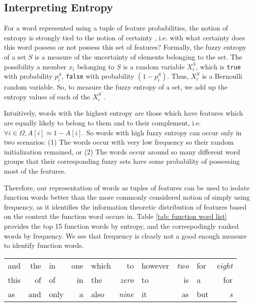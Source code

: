 \documentclass[11pt,a4paper]{article}
\begin{document}
\subsection{Interpreting Entropy} 
\label{ssec: entropy math}
For a word represented using a tuple of feature probabilities, the notion of entropy is strongly tied to the notion of certainty \citep{xuecheng1992entropy}, i.e. with what certainty does this word possess or not possess this set of features? Formally, the fuzzy entropy of a set $S$ is a measure of the uncertainty of elements belonging to the set. The possibility a member $x_i$ belonging to $S$ is a random variable $X^S_i$, which is \texttt{true} with probability $p^S_i$, \texttt{false} with probability $(1 - p^S_i)$. Thus, $X^S_i$ is a Bernoulli random variable. So, to measure the fuzzy entropy of a set, we add up the entropy values of each of the $X^S_i$ \citep{mackay2003information}. 

Intuitively, words with the highest entropy are those which have features which are equally likely to belong to them and to their complement, i.e. $\forall i \in \Omega, A[i] \simeq 1 - A[i]$. So words with high fuzzy entropy can occur only in two scenarios: (1) The words occur with very low frequency so their random initialization remained, or (2) The words occur around so many different word groups that their corresponding fuzzy sets have some probability of possessing most of the features.

Therefore, our representation of words as tuples of features can be used to isolate function words better than the more commonly considered notion of simply using frequency, as it identifies the information theoretic distribution of features based on the context the function word occurs in. Table \ref{tab: function word list} provides the top 15 function words by entropy, and the correspodingly ranked words by frequency. We see that frequency is clearly not a good enough measure to identify function words. 

{\tiny
\begin{table*}[t]
    \centering
    {\small
    \begin{tabular}{l r | l r | l r | l r | l r}
    and		& the   &   in		&   one         &   which	    &   to          &   however	&   \emph{two}  &   for	    &   \emph{eight}  \\
    this    & of    &   of	    &   in          &   the		    &   \emph{zero} &   to		&   is          &   a	    &   for \\
    as	    & and   &   only	&   a           &   also	    &   \emph{nine} &   it		&   as          &   but	    &   \emph{s} 
    \end{tabular}
    }
    \caption{On the left: Top 15 words with highest entropy with frequency $\geq 100$ (note that all of them are function words). On the right: Top 15 words with the highest frequency. The non-function words have been emphasized for comparison.}
    \label{tab: function word list}
\end{table*}
}   
\end{document}
